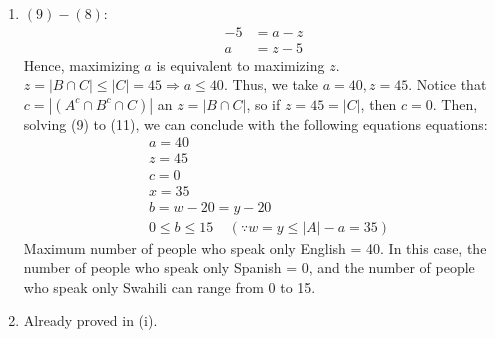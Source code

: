 \documentclass{article}
\begin{document}
\begin{enumerate}[label={(\roman*)}]
    \item 
    $(9)-(8)$:
    \begin{align}
        -5 &= a-z \nonumber\\
        a & = z-5 \nonumber
    \end{align}
    Hence, maximizing $a$ is equivalent to maximizing $z$. 
    $z=|B\cap C|\le |C|=45\Rightarrow a \le 40$.
    Thus, we take $a=40, z=45.$ 
    Notice that $c=|(A^c\cap B^c\cap C)|$ an $z=|B\cap C|$, so if $z=45=|C|$, then $c=0$.
    Then, solving (9) to (11), we can conclude with the following equations equations:
    \begin{align}
        & a = 40 \nonumber\\
        & z = 45 \nonumber\\
        & c = 0 \nonumber\\
        & x = 35 \nonumber\\
        & b = w - 20 = y - 20 \nonumber\\
        & 0 \le b \le 15 ~~~~~ (\because w = y \le |A| - a = 35)
    \end{align}
    Maximum number of people who speak only English = 40. In this case, the number of people who speak only Spanish = 0, and the number of people who speak only Swahili can range from 0 to 15.
    \item 
    Already proved in (i). 
\end{enumerate}
\end{document}
